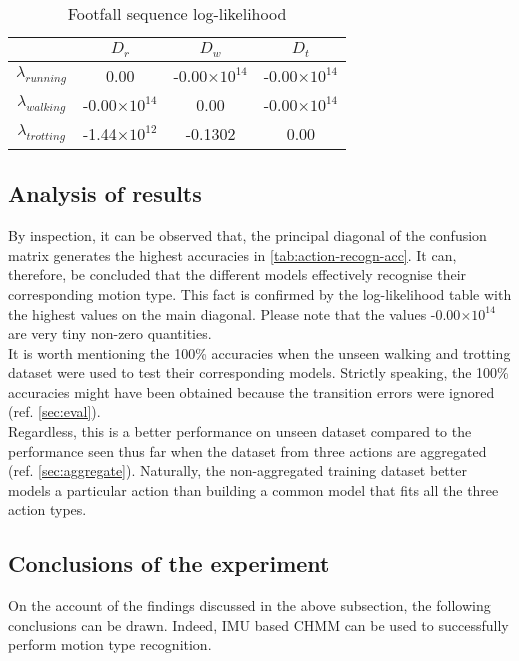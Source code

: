 \begin{table}[h!] 
	\centering
	\begin{tabular}{ |c|c|c|c|} 	
		\hline	
		& \(D_r\) &  \(D_w\) & \(D_t\)\\ 
		\hline
		\(\lambda_{running}\) & 0.00  & -0.00\(\times10^{14}\)   & -0.00\(\times10^{14}\)\\ 
		\hline
		\(\lambda_{walking}\)  & -0.00\(\times10^{14}\)  &  0.00  & -0.00\(\times10^{14}\)\\ 
		\hline
		\(\lambda_{trotting}\)  & -1.44\(\times10^{12}\)  &  -0.1302  & 0.00\\
		\hline	   	
	\end{tabular}
	\caption{Footfall sequence log-likelihood}
	\label{tab:action-recogn-log}
\end{table}

\subsection{Analysis of results}
By inspection, it can be observed that, the principal diagonal of the confusion matrix generates the highest accuracies in \ref{tab:action-recogn-acc}. It can, therefore, be concluded that the different models effectively recognise their corresponding motion type. This fact is confirmed by the log-likelihood table with the highest values on the main diagonal. Please note that the values -0.00\(\times10^{14}\) are very tiny non-zero quantities.\\
It is worth mentioning the 100\% accuracies when the unseen walking and trotting dataset were used to test their corresponding models. Strictly speaking, the 100\% accuracies might have been obtained because the transition errors were ignored (ref. \ref{sec:eval}). \\ Regardless, this is a better performance on unseen dataset compared to the performance seen thus far when the dataset from three actions are aggregated (ref. \ref{sec:aggregate}). Naturally, the non-aggregated training dataset better models a particular action than building a common model that fits all the three action types.

\subsection{Conclusions of the experiment}
On the account of the findings discussed in the above subsection, the following conclusions can be drawn.
Indeed, IMU based CHMM can be used to successfully perform motion type recognition. 


